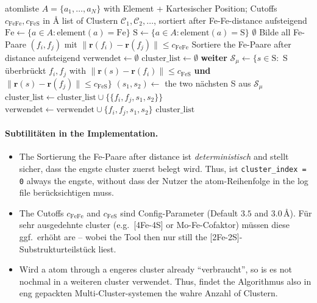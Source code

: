 \documentclass[11pt,a4paper,twoside]{article}
\providecommand{\angstrom}{\text{\AA}}    %
\theoremstyle{remark}
\begin{document}
\begin{algorithm}[H]
\caption{\textsc{FindAllClusters}}
\begin{algorithmic}[1]
\Require atomliste $A = \{a_1, \ldots, a_N\}$ with Element + Kartesischer Position;
         Cutoffs $c_\text{FeFe}, c_\text{FeS}$ in $\angstrom$
\Ensure list of Clustern $\mathcal{C}_1, \mathcal{C}_2, \ldots$,
        sortiert after Fe-Fe-distance aufsteigend
\State $\text{Fe} \gets \{a \in A : \text{element}(a) = \text{Fe}\}$
\State $\text{S}  \gets \{a \in A : \text{element}(a) = \text{S}\}$
  \State \Return $\emptyset$  
\EndIf
\State Bilde all Fe-Paare $(f_i, f_j)$ mit
       $\|\mathbf{r}(f_i) - \mathbf{r}(f_j)\| \leq c_\text{FeFe}$
\State Sortiere the Fe-Paare after distance aufsteigend
\State $\text{verwendet} \gets \emptyset$  
\State $\text{cluster\_list} \gets \emptyset$
    \State \textbf{weiter}  
  \EndIf
  \State $\mathcal{S}_\mu \gets \{s \in \text{S} :$ S \"uberbr\"uckt $f_i, f_j$
         with $\|\mathbf{r}(s) - \mathbf{r}(f_i)\| \leq c_\text{FeS}$
         \textbf{und} $\|\mathbf{r}(s) - \mathbf{r}(f_j)\| \leq c_\text{FeS}\}$
    
    \State $(s_1, s_2) \gets$ the two n\"achsten S aus $\mathcal{S}_\mu$
    \State $\text{cluster\_list} \gets \text{cluster\_list} \cup
           \{\{f_i, f_j, s_1, s_2\}\}$
    \State $\text{verwendet} \gets \text{verwendet} \cup \{f_i, f_j, s_1, s_2\}$
  \EndIf
\EndFor
\State \Return $\text{cluster\_list}$
\end{algorithmic}
\end{algorithm}

\paragraph{Subtilit\"aten in the Implementation.}
\begin{itemize}\setlength{\itemsep}{0pt}
  \item The Sortierung the Fe-Paare after distance ist
        \emph{deterministisch} and stellt sicher, dass the engste
        cluster zuerst belegt wird. Thus, ist
        \texttt{cluster\_index = 0} always the engste, without dass der
        Nutzer the atom-Reihenfolge in the log file ber\"ucksichtigen muss.
  \item The Cutoffs $c_\text{FeFe}$ and $c_\text{FeS}$ sind
        Config-Parameter (Default $3.5$ and $3.0\,\angstrom$). F\"ur
        sehr ausgedehnte cluster (e.g.\ [4Fe-4S] or Mo-Fe-Cofaktor)
        m\"ussen diese ggf.\ erh\"oht are -- wobei the Tool then nur
        still the [2Fe-2S]-Substrukturteilst\"uck liest.
  \item Wird a atom through a engeres cluster already "`verbraucht"',
        so is es not nochmal in a weiteren cluster verwendet.
        Thus, findet the Algorithmus also in eng gepackten
        Multi-Cluster-systemen the wahre Anzahl of Clustern.
\end{itemize}
\end{document}
